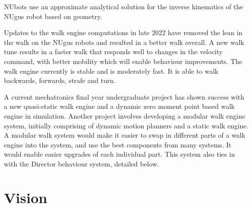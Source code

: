 \documentclass{llncs}
\begin{document}
NUbots use an approximate analytical solution for the inverse kinematics of the NUgus robot based on geometry.

Updates to the walk engine computations in late 2022 have removed the lean in the walk on the NUgus robots and resulted in a better walk overall. A new walk tune results in a faster walk that responds well to changes in the velocity command, with better mobility which will enable behaviour improvements. The walk engine currently is stable and is moderately fast. It is able to walk backwards, forwards, strafe and turn.

A current mechatronics final year undergraduate project has shown success with a new quasi-static walk engine and a dynamic zero moment point based walk engine in simulation. Another project involves developing a modular walk engine system, initially comprising of dynamic motion planners and a static walk engine. A modular walk system would make it easier to swap in different parts of a walk engine into the system, and use the best components from many systems. It would enable easier upgrades of each individual part. This system also ties in with the Director behaviour system, detailed below.

\section{Vision}


\end{document}
